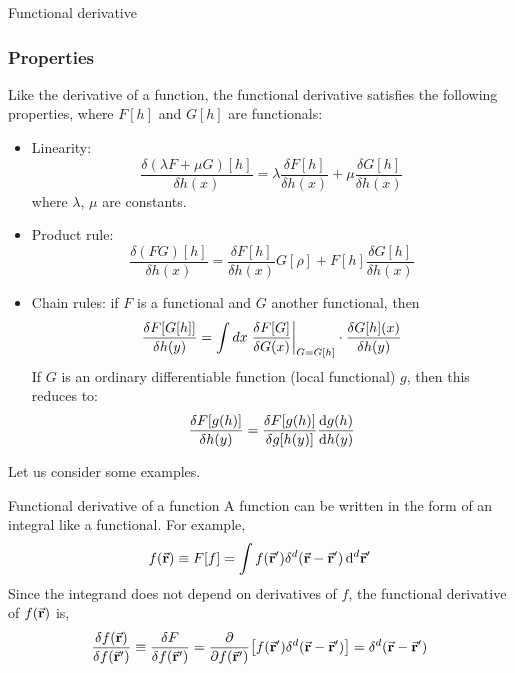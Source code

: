 \documentclass[../../Main/Main.tex]{subfiles}
\begin{document}
\begin{definition}{Functional derivative}{}
\subsubsection{Properties}
Like the derivative of a function, the functional derivative satisfies the following properties, where \( F[h] \) and \( G[h] \) are functionals:
\begin{itemize}
\item Linearity:
\begin{equation*}
  {\frac  {\delta (\lambda F+\mu G)[h ]}{\delta h (x)}}=\lambda {\frac  {\delta F[h ]}{\delta h (x)}}+\mu {\frac  {\delta G[h ]}{\delta h(x)}}
\end{equation*}
where \( \lambda\), \(\mu  \) are constants.
\item Product rule:
\begin{equation*}
{\frac  {\delta (FG)[h ]}{\delta h(x)}}={\frac  {\delta F[h ]}{\delta h (x)}}G[\rho ]+F[h]{\frac  {\delta G[h ]}{\delta h (x)}}
\end{equation*}
\item Chain rules:
if \( F \)  is a functional and \( G \)  another functional, then
\begin{equation*}
  \frac{\delta F[G[h]] }{\delta h(y)}  = \int dx \eval{\frac{\delta F[G]}{\delta G(x)}}_{G = G[h]} \cdot\frac {\delta G[h](x)} {\delta h(y)}
\end{equation*}
If \( G \)  is an ordinary differentiable function (local functional) \( g \), then this reduces to:
\begin{equation*}
   {\frac {\delta F[g( h )]}{\delta h(y)}}={\frac {\delta F[g( h)]}{\delta g[h (y)]}} \dv{g(h )}{ h(y)}
\end{equation*}
\end{itemize}
\end{definition}

Let us consider some examples.

\begin{example}{Functional derivative of a function}{}
A function can be written in the form of an integral like a functional. For example,
\begin{equation*}
  f(\va{r}) \equiv F[ f ] = \int f ( \va{r}') \delta^d(\va{r}-\va{r}')\dd[d]{\va{r}'}
\end{equation*}
Since the integrand does not depend on derivatives of \( f \), the functional derivative of \(   f(\va{r})  \)  is,
\begin{equation}
  \frac{\delta f (\va{r})}{\delta f (\va{r}')} \equiv \frac{\delta F}{\delta f (\va{r}')}
  =\pdv{}{f (\va{r}')}  \qty[ f ( \va{r}') \delta^d (\va{r}-\va{r}')] =  \delta^d (\va{r}-\va{r}')
  \label{eq:17_12}
\end{equation}

\end{example}
\end{document}
